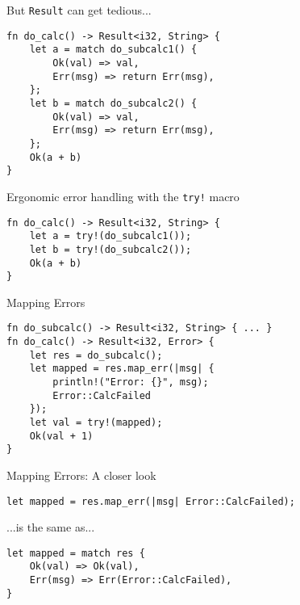 
\begin{frame}[fragile]{But \texttt{Result} can get tedious...}
\begin{verbatim}
fn do_calc() -> Result<i32, String> {
    let a = match do_subcalc1() {
        Ok(val) => val,
        Err(msg) => return Err(msg),
    };
    let b = match do_subcalc2() {
        Ok(val) => val,
        Err(msg) => return Err(msg),
    };
    Ok(a + b)
}
\end{verbatim}
\end{frame}


\begin{frame}[fragile]{Ergonomic error handling with the \texttt{try!} macro}
\begin{verbatim}
fn do_calc() -> Result<i32, String> {
    let a = try!(do_subcalc1());
    let b = try!(do_subcalc2());
    Ok(a + b)
}
\end{verbatim}
\end{frame}


\begin{frame}[fragile]{Mapping Errors}
\begin{verbatim}
fn do_subcalc() -> Result<i32, String> { ... }
fn do_calc() -> Result<i32, Error> {
    let res = do_subcalc();
    let mapped = res.map_err(|msg| {
        println!("Error: {}", msg);
        Error::CalcFailed
    });
    let val = try!(mapped);
    Ok(val + 1)
}
\end{verbatim}
\end{frame}


\begin{frame}[fragile]{Mapping Errors: A closer look}
\begin{verbatim}
let mapped = res.map_err(|msg| Error::CalcFailed);
\end{verbatim}
...is the same as...
\begin{verbatim}
let mapped = match res {
    Ok(val) => Ok(val),
    Err(msg) => Err(Error::CalcFailed),
}
\end{verbatim}
\end{frame}

